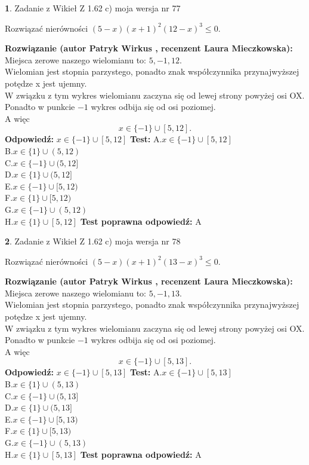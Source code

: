 \documentclass[12pt, a4paper]{article}
\theoremstyle{definition} %
\newtheorem{zad}{}
\newcommand{\zadStart}[1]{\begin{zad}#1\newline}
\newcommand{\zadStop}{\end{zad}}
\newcommand{\rozwStart}[2]{\noindent \textbf{Rozwiązanie (autor #1 , recenzent #2): }\newline}
\newcommand{\rozwStop}{\newline}
\newcommand{\odpStart}{\noindent \textbf{Odpowiedź:}\newline}
\newcommand{\odpStop}{\newline}
\newcommand{\testStart}{\noindent \textbf{Test:}\newline}
\newcommand{\testStop}{\newline}
\newcommand{\kluczStart}{\noindent \textbf{Test poprawna odpowiedź:}\newline}
\newcommand{\kluczStop}{\newline}
\begin{document}
\zadStart{Zadanie z Wikieł Z 1.62 c) moja wersja nr 77}

Rozwiązać nierówności $(5-x)(x+1)^{2}(12-x)^{3}\le0$.
\zadStop
\rozwStart{Patryk Wirkus}{Laura Mieczkowska}
Miejsca zerowe naszego wielomianu to: $5, -1, 12$.\\
Wielomian jest stopnia parzystego, ponadto znak współczynnika przy\linebreak najwyższej potędze x jest ujemny.\\ W związku z tym wykres wielomianu zaczyna się od lewej strony powyżej osi OX.\\
Ponadto w punkcie $-1$ wykres odbija się od osi poziomej.\\
A więc $$x \in \{-1\} \cup [5,12].$$
\rozwStop
\odpStart
$x \in \{-1\} \cup [5,12]$
\odpStop
\testStart
A.$x \in \{-1\} \cup [5,12]$\\
B.$x \in \{1\} \cup (5,12)$\\
C.$x \in \{-1\} \cup (5,12]$\\
D.$x \in \{1\} \cup (5,12]$\\
E.$x \in \{-1\} \cup [5,12)$\\
F.$x \in \{1\} \cup [5,12)$\\
G.$x \in \{-1\} \cup (5,12)$\\
H.$x \in \{1\} \cup [5,12]$
\testStop
\kluczStart
A
\kluczStop



\zadStart{Zadanie z Wikieł Z 1.62 c) moja wersja nr 78}

Rozwiązać nierówności $(5-x)(x+1)^{2}(13-x)^{3}\le0$.
\zadStop
\rozwStart{Patryk Wirkus}{Laura Mieczkowska}
Miejsca zerowe naszego wielomianu to: $5, -1, 13$.\\
Wielomian jest stopnia parzystego, ponadto znak współczynnika przy\linebreak najwyższej potędze x jest ujemny.\\ W związku z tym wykres wielomianu zaczyna się od lewej strony powyżej osi OX.\\
Ponadto w punkcie $-1$ wykres odbija się od osi poziomej.\\
A więc $$x \in \{-1\} \cup [5,13].$$
\rozwStop
\odpStart
$x \in \{-1\} \cup [5,13]$
\odpStop
\testStart
A.$x \in \{-1\} \cup [5,13]$\\
B.$x \in \{1\} \cup (5,13)$\\
C.$x \in \{-1\} \cup (5,13]$\\
D.$x \in \{1\} \cup (5,13]$\\
E.$x \in \{-1\} \cup [5,13)$\\
F.$x \in \{1\} \cup [5,13)$\\
G.$x \in \{-1\} \cup (5,13)$\\
H.$x \in \{1\} \cup [5,13]$
\testStop
\kluczStart
A
\kluczStop
\end{document}
